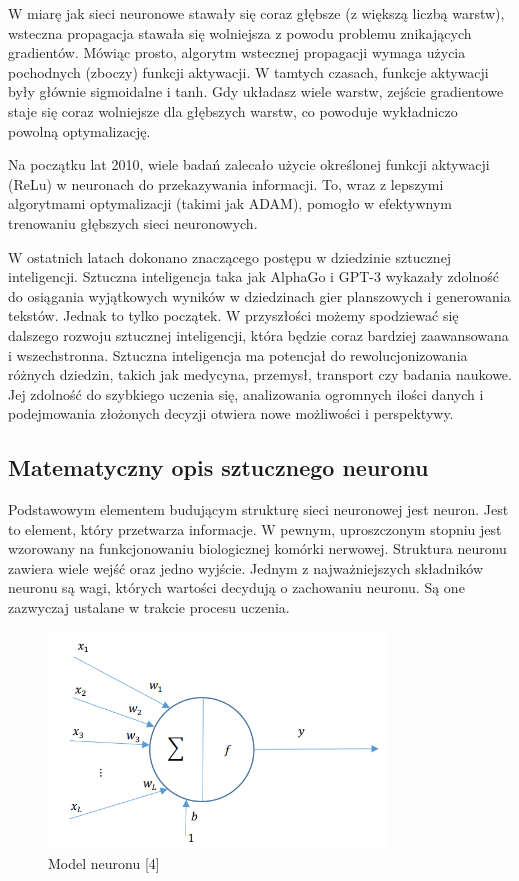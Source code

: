 \documentclass{article}
\begin{document}
W miarę jak sieci neuronowe stawały się coraz głębsze (z większą liczbą warstw), wsteczna propagacja stawała się wolniejsza z powodu problemu znikających gradientów.
Mówiąc prosto, algorytm wstecznej propagacji wymaga użycia pochodnych (zboczy) funkcji aktywacji.
W tamtych czasach, funkcje aktywacji były głównie sigmoidalne i tanh.
Gdy układasz wiele warstw, zejście gradientowe staje się coraz wolniejsze dla głębszych warstw, co powoduje wykładniczo powolną optymalizację.

Na początku lat 2010, wiele badań zalecało użycie określonej funkcji aktywacji (ReLu) w neuronach do przekazywania informacji. To, wraz z lepszymi algorytmami optymalizacji (takimi jak ADAM), pomogło w efektywnym trenowaniu głębszych sieci neuronowych.


W ostatnich latach dokonano znaczącego postępu w dziedzinie sztucznej inteligencji.
Sztuczna inteligencja taka jak AlphaGo i GPT-3 wykazały zdolność do osiągania wyjątkowych wyników w dziedzinach gier planszowych i generowania tekstów. Jednak to tylko początek. W przyszłości możemy spodziewać się dalszego rozwoju sztucznej inteligencji, która będzie coraz bardziej zaawansowana i wszechstronna.
Sztuczna inteligencja ma potencjał do rewolucjonizowania różnych dziedzin, takich jak medycyna, przemysł, transport czy badania naukowe.
Jej zdolność do szybkiego uczenia się, analizowania ogromnych ilości danych i podejmowania złożonych decyzji otwiera nowe możliwości i perspektywy.
\subsection{Matematyczny opis sztucznego neuronu}
Podstawowym elementem budującym strukturę sieci neuronowej jest neuron. Jest to element, który przetwarza informacje.
W pewnym, uproszczonym stopniu jest wzorowany na funkcjonowaniu biologicznej komórki nerwowej.
Struktura neuronu zawiera wiele wejść oraz jedno wyjście.
Jednym z najważniejszych składników neuronu są wagi, których wartości decydują o zachowaniu neuronu. Są one zazwyczaj ustalane w trakcie procesu uczenia.
\begin{figure}[H]
    \centering
    \includegraphics[width=0.8\textwidth, keepaspectratio]{model_neuronu.png}
    \caption{Model neuronu [4]}
    \label{fig:zdjecie}
\end{figure}
\end{document}

